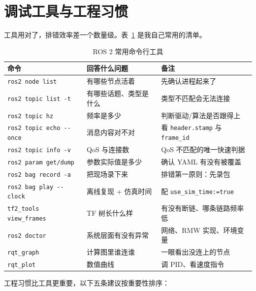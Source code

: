 \section{调试工具与工程习惯}\label{sec:25-tool}
\label{sec:25-habit}

工具用对了，排错效率差一个数量级。表~\ref{tab:25-tools} 是我自己常用的清单。

\begin{table}[htbp]
  \centering
  \caption{ROS 2 常用命令行工具}\label{tab:25-tools}
  \small
  \begin{tabular}{llp{6.2cm}}
    \toprule
    命令 & 回答什么问题 & 备注 \\
    \midrule
    \lstinline{ros2 node list} & 有哪些节点活着 & 先确认进程起来了 \\
    \lstinline{ros2 topic list -t} & 有哪些话题、类型是什么 & 类型不匹配会无法连接 \\
    \lstinline{ros2 topic hz} & 频率是多少 & 判断驱动/算法是否跟得上 \\
    \lstinline{ros2 topic echo --once} & 消息内容对不对 & 看 \lstinline{header.stamp} 与 \lstinline{frame_id} \\
    \lstinline{ros2 topic info -v} & QoS 与连接数 & QoS 不匹配的唯一快速判据 \\
    \lstinline{ros2 param get/dump} & 参数实际值是多少 & 确认 YAML 有没有被覆盖 \\
    \lstinline{ros2 bag record -a} & 把现场录下来 & 排错第一原则：先录包 \\
    \lstinline{ros2 bag play --clock} & 离线复现 + 仿真时间 & 配 \lstinline{use_sim_time:=true} \\
    \lstinline{tf2_tools view_frames} & TF 树长什么样 & 有没有断链、哪条链路频率低 \\
    \lstinline{ros2 doctor} & 系统层面有没有异常 & 网络、RMW 实现、环境变量 \\
    \lstinline{rqt_graph} & 计算图里谁连谁 & 一眼看出没连上的节点 \\
    \lstinline{rqt_plot} & 数值曲线 & 调 PID、看速度指令 \\
    \bottomrule
  \end{tabular}
\end{table}

工程习惯比工具更重要，以下五条建议按重要性排序：

